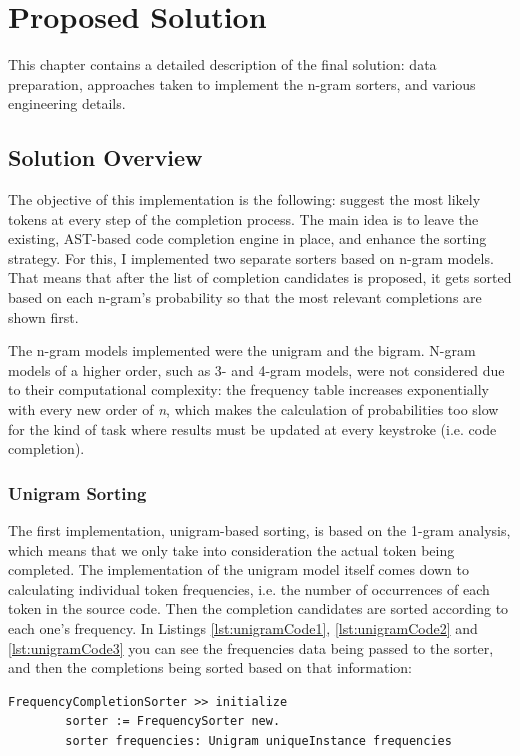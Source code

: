\chapter{Proposed Solution}
\label{chap:ProposedSolution}

This chapter contains a detailed description of the final solution: data preparation, approaches taken to implement the n-gram sorters, and various engineering details.

\section{Solution Overview}
\label{sec:ProposedSolution-Overview}
The objective of this implementation is the following: suggest the most likely tokens at every step of the completion process. The main idea is to leave the existing, AST-based code completion engine in place, and enhance the sorting strategy. For this, I implemented two separate sorters based on n-gram models. That means that after the list of completion candidates is proposed, it gets sorted based on each n-gram's probability so that the most relevant completions are shown first.

The n-gram models implemented were the unigram and the bigram. N-gram models of a higher order, such as 3- and 4-gram models, were not considered due to their computational complexity: the frequency table increases exponentially with every new order of \textit{n}, which makes the calculation of probabilities too slow for the kind of task where results must be updated at every keystroke (i.e. code completion).

\subsection{Unigram Sorting}
The first implementation, unigram-based sorting, is based on the 1-gram analysis, which means that we only take into consideration the actual token being completed. The implementation of the unigram model itself comes down to calculating individual token frequencies, i.e. the number of occurrences of each token in the source code. Then the completion candidates are sorted according to each one's frequency. In Listings \ref{lst:unigramCode1}, \ref{lst:unigramCode2} and \ref{lst:unigramCode3}  you can see the frequencies data being passed to the sorter, and then the completions being sorted based on that information:

\begin{lstlisting}[caption={The unigram sorter implementation: passing the frequencies to the sorter}, label={lst:unigramCode1}]
    FrequencyCompletionSorter >> initialize
        sorter := FrequencySorter new.
        sorter frequencies: Unigram uniqueInstance frequencies
\end{lstlisting}

